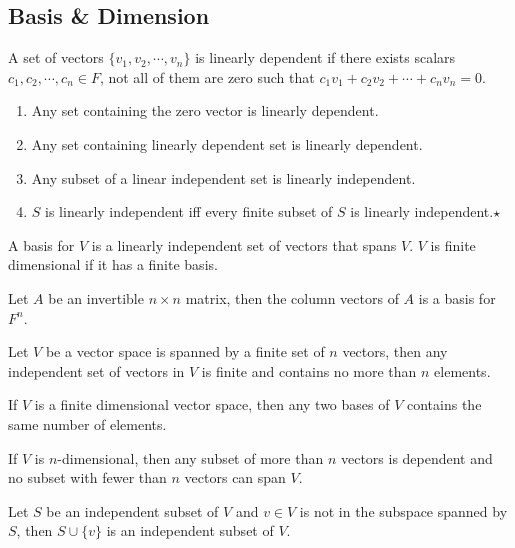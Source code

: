 \subsection{Basis \& Dimension}
	\begin{definition}
		A set of vectors $\{ v_1, v_2, \cdots, v_n \}$ is linearly dependent if there exists scalars $c_1, c_2, \cdots, c_n \in F$, not all of them are zero such that $c_1v_1 + c_2v_2 + \cdots + c_nv_n = 0$.
	\end{definition}
	\begin{remark}
		\begin{enumerate}
			\item Any set containing the zero vector is linearly dependent.
			\item Any set containing linearly dependent set is linearly dependent.
			\item Any subset of a linear independent set is linearly independent.
			\item $S$ is linearly independent iff every finite subset of $S$ is linearly independent.$\star$
		\end{enumerate}
	\end{remark}
	\begin{definition}
		A basis for $V$ is a linearly independent set of vectors that spans $V$. $V$ is finite dimensional if it has a finite basis.
	\end{definition}
	\begin{remark}
		Let $A$ be an invertible $n \times n$ matrix, then the column vectors of $A$ is a basis for $F^n$.
	\end{remark}
	\begin{theorem}
		Let $V$ be a vector space is spanned by a finite set of $n$ vectors, then any independent set of vectors in $V$ is finite and contains no more than $n$ elements.
	\end{theorem}
	\begin{corollary}
		If $V$ is a finite dimensional vector space, then any two bases of $V$ contains the same number of elements.
	\end{corollary}
	\begin{corollary}
		If $V$ is $n$-dimensional, then any subset of more than $n$ vectors is dependent and no subset with fewer than $n$ vectors can span $V$.
	\end{corollary}
	\begin{lemma}
		Let $S$ be an independent subset of $V$ and $v \in V$ is not in the subspace spanned by $S$, then $S \cup \{v\}$ is an independent subset of $V$.
	\end{lemma}
